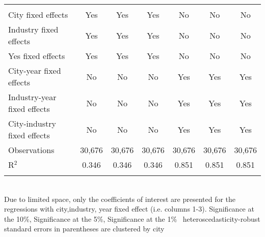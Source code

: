 \documentclass[12pt]{article}
\begin{document}
\begin{table}[!htbp]
\begin{adjustbox}{width=\textwidth, totalheight=\baselineskip,keepaspectratio}
\begin{tabular}{@{\extracolsep{5pt}}lcccccc}
 \hline \\[-1.8ex] 
City fixed effects & Yes & Yes & Yes & No & No & No \\ 
Industry fixed effects & Yes & Yes & Yes & No & No & No \\ 
Yes fixed effects & Yes & Yes & Yes & No & No & No \\ 
City-year fixed effects & No & No & No & Yes & Yes & Yes \\ 
Industry-year fixed effects & No & No & No & Yes & Yes & Yes \\ 
City-industry fixed effects & No & No & No & Yes & Yes & Yes \\ 
Observations & 30,676 & 30,676 & 30,676 & 30,676 & 30,676 & 30,676 \\ 
R$^{2}$ & 0.346 & 0.346 & 0.346 & 0.851 & 0.851 & 0.851 \\ 
\hline 
\hline \\[-1.8ex] 
\end{tabular}
\end{adjustbox}
\begin{tablenotes} 
 \small 
 \item \\ 
\footnotesize{
Due to limited space, only the coefficients of interest are presented 
for the regressions with city,industry, year fixed effect (i.e. columns 1-3).
\sym{*} Significance at the 10\%, \sym{**} Significance at the 5\%, \sym{***} Significance at the 1\% \
heteroscedasticity-robust standard errors in parentheses are clustered by city 
}
 
\end{tablenotes}
\end{table}
\end{document}
